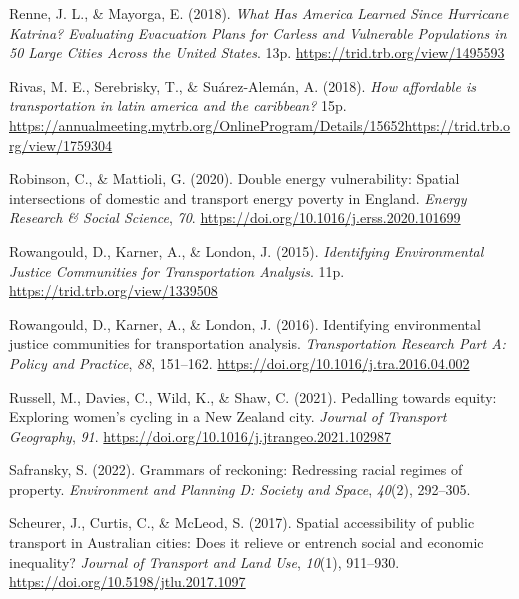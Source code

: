 \documentclass[
  letterpaper,
  DIV=11,
  numbers=noendperiod]{scrartcl}
\newlength{\cslhangindent}
\newenvironment{CSLReferences}[2] %
 {\begin{list}{}{%
  \setlength{\itemindent}{0pt}
  \setlength{\leftmargin}{0pt}
  \setlength{\parsep}{0pt}
  \ifodd #1
   \setlength{\leftmargin}{\cslhangindent}
   \setlength{\itemindent}{-1\cslhangindent}
  \fi
  \setlength{\itemsep}{#2\baselineskip}}}
 {\end{list}}
\begin{document}
\begin{CSLReferences}{1}{0}
Renne, J. L., \& Mayorga, E. (2018). \emph{What {Has America Learned
Since Hurricane Katrina}? {Evaluating Evacuation Plans} for {Carless}
and {Vulnerable Populations} in 50 {Large Cities Across} the {United
States}}. 13p. \url{https://trid.trb.org/view/1495593}

Rivas, M. E., Serebrisky, T., \& Suárez-Alemán, A. (2018). \emph{How
affordable is transportation in latin america and the caribbean?} 15p.
\url{https://annualmeeting.mytrb.org/OnlineProgram/Details/15652https://trid.trb.org/view/1759304}

Robinson, C., \& Mattioli, G. (2020). Double energy vulnerability:
{Spatial} intersections of domestic and transport energy poverty in
{England}. \emph{Energy Research \& Social Science}, \emph{70}.
\url{https://doi.org/10.1016/j.erss.2020.101699}

Rowangould, D., Karner, A., \& London, J. (2015). \emph{Identifying
{Environmental Justice Communities} for {Transportation Analysis}}. 11p.
\url{https://trid.trb.org/view/1339508}

Rowangould, D., Karner, A., \& London, J. (2016). Identifying
environmental justice communities for transportation analysis.
\emph{Transportation Research Part A: Policy and Practice}, \emph{88},
151--162. \url{https://doi.org/10.1016/j.tra.2016.04.002}

Russell, M., Davies, C., Wild, K., \& Shaw, C. (2021). Pedalling towards
equity: {Exploring} women's cycling in a {New Zealand} city.
\emph{Journal of Transport Geography}, \emph{91}.
\url{https://doi.org/10.1016/j.jtrangeo.2021.102987}

Safransky, S. (2022). Grammars of reckoning: Redressing racial regimes
of property. \emph{Environment and Planning D: Society and Space},
\emph{40}(2), 292--305.

Scheurer, J., Curtis, C., \& McLeod, S. (2017). Spatial accessibility of
public transport in {Australian} cities: {Does} it relieve or entrench
social and economic inequality? \emph{Journal of Transport and Land
Use}, \emph{10}(1), 911--930.
\url{https://doi.org/10.5198/jtlu.2017.1097}


\end{CSLReferences}
\end{document}
